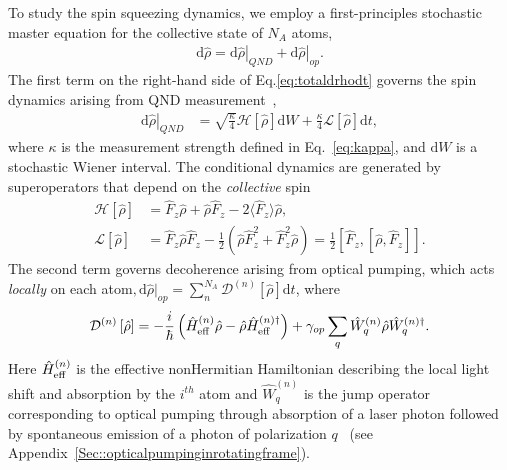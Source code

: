 \documentclass[preprint,aps,pra,onecolumn,superscriptaddress]{revtex4-1} %
\newcommand{\expect}[1]{\big\langle #1 \big\rangle}
\begin{document}
To study the spin squeezing dynamics, we employ a first-principles stochastic master equation for the collective state of $N_A$ atoms,
\begin{align}\label{eq:totaldrhodt}
\mathrm{d}\hat{\rho}= \left.\mathrm{d}\hat{\rho}\right|_{QND}+\left.\mathrm{d}\hat{\rho}\right|_{op}.
\end{align}
The first term on the right-hand side of Eq.\eqref{eq:totaldrhodt} governs the spin dynamics arising from QND measurement~\cite{Jacobs2006,Baragiola2014},
\begin{align}
\left.\mathrm{d}\hat{\rho}\right|_{QND} &= \sqrt{\frac{\kappa}{4}}\mathcal{H}\left[\hat{\rho} \right]\mathrm{d}W + \frac{\kappa}{4}\mathcal{L}\left[ \hat{\rho}\right]\mathrm{d}t, 
\end{align}
where  $\kappa$ is the measurement strength defined in Eq.~\eqref{eq:kappa}, and $\mathrm{d}W$ is a stochastic Wiener interval. The conditional dynamics are generated by superoperators that depend on the {\em collective} spin
\begin{subequations}
\begin{align}
\mathcal{H}\left[ \hat{\rho}\right] &= \hat{F}_z \hat{\rho} + \hat{\rho}\hat{F}_z -2\expect{\hat{F}_z}\hat{\rho}, \\
\mathcal{L}\left[ \hat{\rho} \right] &= \hat{F}_z \hat{\rho}\hat{F}_z -\frac{1}{2}\left(\hat{\rho}\hat{F}_z^2+\hat{F}_z^2\hat{\rho} \right)=\frac{1}{2}\left[\hat{F}_z,\left[\hat{\rho},\hat{F}_z \right] \right].
\end{align}
\end{subequations}
The second term governs decoherence arising from optical pumping, which acts {\em locally} on each atom$,\mathrm{d}\hat{\rho}|_{op}=\sum_n^{N_A} \mathcal{D}^{(n)}\left[ \hat{\rho}\right] \mathrm{d}t$, where 
\begin{equation}
\mathcal{D}^{(n)}\left[ \hat{\rho}\right] = -\frac{i}{\hbar}\left(\hat{H}^{(n)}_{\rm eff}\hat{\rho} - \hat{\rho} \hat{H}^{(n)\dag}_{\rm eff}\right) + \gamma_{op} \sum_q \hat{W}^{(n)}_q \hat{\rho}\hat{W}^{(n)\dag}_q.
\label{op_superator}
\end{equation}
Here $\hat{H}^{(n)}_{\rm eff}$ is the effective nonHermitian Hamiltonian describing the local light shift and absorption by the $i^{th}$ atom and $\hat{W}^{(n)}_q$ is the jump operator corresponding to optical pumping through absorption of a laser photon followed by spontaneous emission of a photon of polarization $q$~\cite{Deutsch2010a} (see Appendix~\ref{Sec::opticalpumpinginrotatingframe}).   
\end{document}
